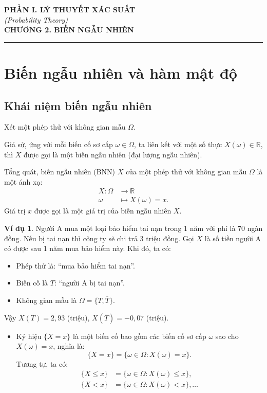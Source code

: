 \documentclass[12pt,a4paper]{article}
\theoremstyle{definition}
\newtheorem{vidu}{Ví dụ}[section]
\begin{document}
\begin{center}
    {\large \textbf{PHẦN I. LÝ THUYẾT XÁC SUẤT}}\\[0.3em]
    {\normalsize \textit{(Probability Theory)}}\\[1em]
    {\LARGE \textbf{CHƯƠNG 2. BIẾN NGẪU NHIÊN}}
\end{center}

\vspace{1em}
\hrule
\vspace{1.5em}

\section{Biến ngẫu nhiên và hàm mật độ}

\subsection{Khái niệm biến ngẫu nhiên}
Xét một phép thử với không gian mẫu $\Omega$.

Giả sử, ứng với mỗi biến cố sơ cấp $\omega \in \Omega$, ta liên kết với một số thực $X(\omega) \in \mathbb{R}$, thì $X$ được gọi là một biến ngẫu nhiên (đại lượng ngẫu nhiên).

Tổng quát, biến ngẫu nhiên (BNN) $X$ của một phép thử với không gian mẫu $\Omega$ là một ánh xạ:
\begin{align*}
X: \Omega &\to \mathbb{R} \\
\omega &\mapsto X(\omega) = x.
\end{align*}
Giá trị $x$ được gọi là một giá trị của biến ngẫu nhiên $X$.

\begin{vidu}
Người A mua một loại bảo hiểm tai nạn trong 1 năm với phí là 70 ngàn đồng. Nếu bị tai nạn thì công ty sẽ chi trả 3 triệu đồng. Gọi $X$ là số tiền người A có được sau 1 năm mua bảo hiểm này. Khi đó, ta có:
\begin{itemize}
    \item Phép thử là: ``mua bảo hiểm tai nạn''.
    \item Biến cố là $T$: ``người A bị tai nạn''.
    \item Không gian mẫu là $\Omega = \{T, \overline{T}\}$.
\end{itemize}
Vậy $X(T) = 2{,}93$ (triệu), $X(\overline{T}) = -0{,}07$ (triệu).
\end{vidu}

\begin{itemize}
    \item Ký hiệu $\{X = x\}$ là một biến cố bao gồm các biến cố sơ cấp $\omega$ sao cho $X(\omega) = x$, nghĩa là:
    \[
    \{X = x\} = \{\omega \in \Omega : X(\omega) = x\}.
    \]
    Tương tự, ta có:
    \begin{align*}
    \{X \le x\} &= \{\omega \in \Omega : X(\omega) \le x\}, \\
    \{X < x\} &= \{\omega \in \Omega : X(\omega) < x\}, \dots
    \end{align*}
\end{itemize}
\end{document}
